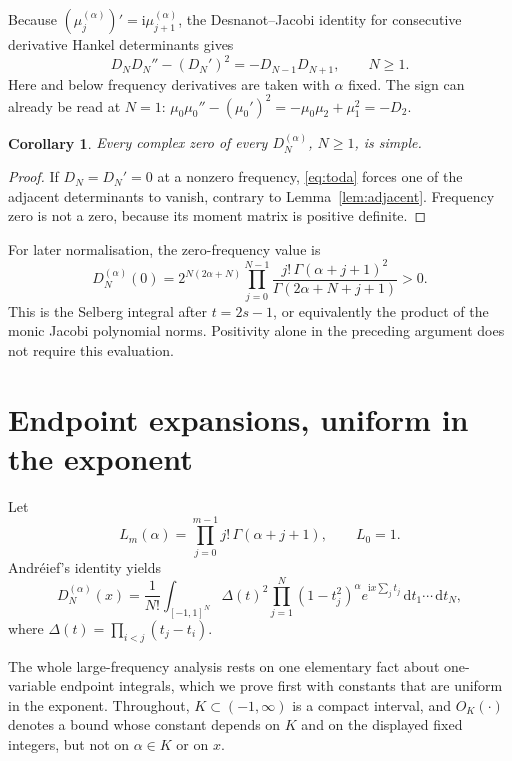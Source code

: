 \documentclass[11pt]{article}
\numberwithin{equation}{section}
\newtheorem{corollary}[theorem]{Corollary}
\theoremstyle{remark}
\newcommand{\ii}{\mathrm{i}}
\newcommand{\dd}{\,\mathrm{d}}
\begin{document}
Because $(\mu_j^{(\alpha)})'=\ii\mu_{j+1}^{(\alpha)}$, the
Desnanot--Jacobi identity for consecutive derivative Hankel determinants
gives
\begin{equation}\label{eq:toda}
 D_N D_N''-(D_N')^2=-D_{N-1}D_{N+1},\qquad N\ge1.
\end{equation}
Here and below frequency derivatives are taken with $\alpha$ fixed.
The sign can already be read at $N=1$:
$\mu_0\mu_0''-(\mu_0')^2=-\mu_0\mu_2+\mu_1^2=-D_2$.

\begin{corollary}\label{cor:simple}
Every complex zero of every $D_N^{(\alpha)}$, $N\ge1$, is simple.
\end{corollary}

\begin{proof}
If $D_N=D_N'=0$ at a nonzero frequency, \eqref{eq:toda} forces one of
the adjacent determinants to vanish, contrary to Lemma~\ref{lem:adjacent}.
Frequency zero is not a zero, because its moment matrix is positive
definite.
\end{proof}

For later normalisation, the zero-frequency value is
\begin{equation}\label{eq:selbergzero}
 D_N^{(\alpha)}(0)=2^{N(2\alpha+N)}
 \prod_{j=0}^{N-1}
 \frac{j!\,\Gamma(\alpha+j+1)^2}
      {\Gamma(2\alpha+N+j+1)}>0.
\end{equation}
This is the Selberg integral after $t=2s-1$, or equivalently the product
of the monic Jacobi polynomial norms. Positivity alone in the preceding
argument does not require this evaluation.

\section{Endpoint expansions, uniform in the exponent}\label{sec:endpoint}

Let
\begin{equation}\label{eq:Laguerreproduct}
 L_m(\alpha)=\prod_{j=0}^{m-1}j!\,\Gamma(\alpha+j+1),\qquad L_0=1.
\end{equation}
Andr\'eief's identity yields
\begin{equation}\label{eq:andreief}
 D_N^{(\alpha)}(x)=\frac1{N!}
 \int_{[-1,1]^N}\Delta(t)^2\prod_{j=1}^N(1-t_j^2)^\alpha
                    e^{\ii x\sum_jt_j}\dd t_1\cdots\dd t_N,
\end{equation}
where $\Delta(t)=\prod_{i<j}(t_j-t_i)$.

The whole large-frequency analysis rests on one elementary fact about
one-variable endpoint integrals, which we prove first with constants that
are uniform in the exponent. Throughout, $K\subset(-1,\infty)$ is a compact
interval, and $O_K(\cdot)$ denotes a bound whose constant depends on $K$
and on the displayed fixed integers, but not on $\alpha\in K$ or on $x$.
\end{document}
